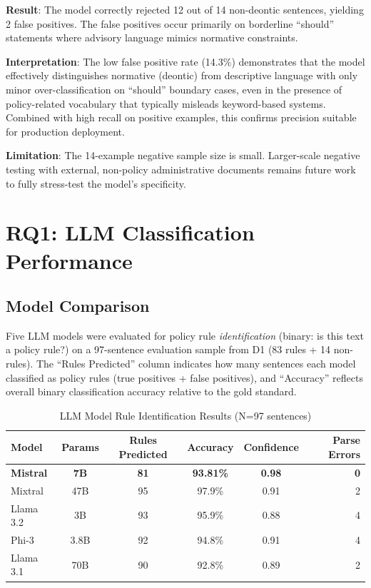 \textbf{Result}: The model correctly rejected 12 out of 14 non-deontic sentences, yielding 2 false positives. The false positives occur primarily on borderline ``should'' statements where advisory language mimics normative constraints.

\textbf{Interpretation}: The low false positive rate (14.3\%) demonstrates that the model effectively distinguishes normative (deontic) from descriptive language with only minor over-classification on ``should'' boundary cases, even in the presence of policy-related vocabulary that typically misleads keyword-based systems. Combined with high recall on positive examples, this confirms precision suitable for production deployment.

\textbf{Limitation}: The 14-example negative sample size is small. Larger-scale negative testing with external, non-policy administrative documents remains future work to fully stress-test the model's specificity.

\section{RQ1: LLM Classification Performance}
\label{sec:model-comparison}

\subsection{Model Comparison}

Five LLM models were evaluated for policy rule \textit{identification} (binary: is this text a policy rule?) on a 97-sentence evaluation sample from D1 (83 rules + 14 non-rules). The ``Rules Predicted'' column indicates how many sentences each model classified as policy rules (true positives + false positives), and ``Accuracy'' reflects overall binary classification accuracy relative to the gold standard.

\begin{table}[htbp]
\centering
\caption{LLM Model Rule Identification Results (N=97 sentences)}
\label{tab:model-comparison}
\begin{tabular}{lccccr}
\toprule
\textbf{Model} & \textbf{Params} & \textbf{Rules Predicted} & \textbf{Accuracy} & \textbf{Confidence} & \textbf{Parse Errors} \\
\midrule
\textbf{Mistral} & \textbf{7B} & \textbf{81} & \textbf{93.81\%} & \textbf{0.98} & \textbf{0} \\
Mixtral & 47B & 95 & 97.9\% & 0.91 & 2 \\
Llama 3.2 & 3B & 93 & 95.9\% & 0.88 & 4 \\
Phi-3 & 3.8B & 92 & 94.8\% & 0.91 & 4 \\
Llama 3.1 & 70B & 90 & 92.8\% & 0.89 & 2 \\
\bottomrule
\end{tabular}
\end{table}

